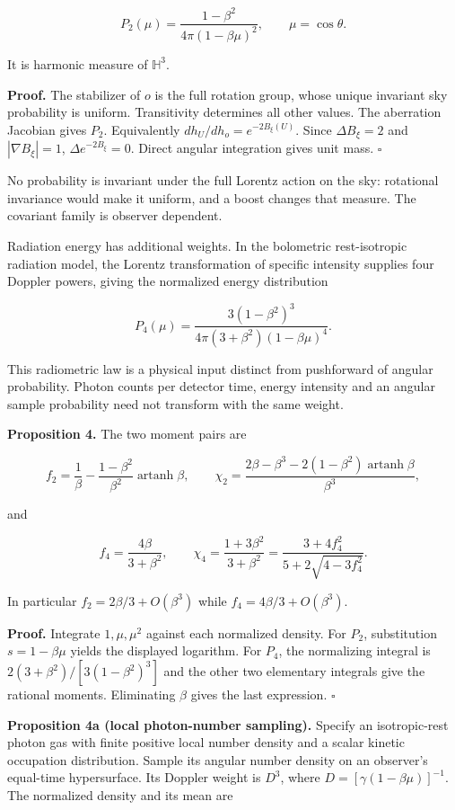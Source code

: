 \documentclass[
  11pt,
  a4paper,
]{article}
\begin{document}
\[P_2(\mu)=\frac{1-\beta^2}{4\pi(1-\beta\mu)^2},\qquad \mu=\cos\theta.\]

It is harmonic measure of \(\mathbb H^3\).

\textbf{Proof.} The stabilizer of \(o\) is the full rotation group, whose unique invariant sky probability is uniform. Transitivity determines all other values. The aberration Jacobian gives \(P_2\). Equivalently \(dh_U/dh_o=e^{-2B_\xi(U)}\). Since \(\Delta B_\xi=2\) and \(|\nabla B_\xi|=1\), \(\Delta e^{-2B_\xi}=0\). Direct angular integration gives unit mass. \(\square\)

No probability is invariant under the full Lorentz action on the sky: rotational invariance would make it uniform, and a boost changes that measure. The covariant family is observer dependent.

Radiation energy has additional weights. In the bolometric rest-isotropic radiation model, the Lorentz transformation of specific intensity supplies four Doppler powers, giving the normalized energy distribution

\[P_4(\mu)=
\frac{3(1-\beta^2)^3}
{4\pi(3+\beta^2)(1-\beta\mu)^4}.\]

This radiometric law is a physical input distinct from pushforward of angular probability. Photon counts per detector time, energy intensity and an angular sample probability need not transform with the same weight.

\textbf{Proposition 4.} The two moment pairs are

\[f_2=\frac1\beta-\frac{1-\beta^2}{\beta^2}\operatorname{artanh}\beta,\qquad
\chi_2=\frac{2\beta-\beta^3-2(1-\beta^2)\operatorname{artanh}\beta}{\beta^3},\]

and

\[f_4=\frac{4\beta}{3+\beta^2},\qquad
\chi_4=\frac{1+3\beta^2}{3+\beta^2}
=\frac{3+4f_4^2}{5+2\sqrt{4-3f_4^2}}.\]

In particular \(f_2=2\beta/3+O(\beta^3)\) while \(f_4=4\beta/3+O(\beta^3)\).

\textbf{Proof.} Integrate \(1,\mu,\mu^2\) against each normalized density. For \(P_2\), substitution \(s=1-\beta\mu\) yields the displayed logarithm. For \(P_4\), the normalizing integral is \(2(3+\beta^2)/[3(1-\beta^2)^3]\) and the other two elementary integrals give the rational moments. Eliminating \(\beta\) gives the last expression. \(\square\)

\textbf{Proposition 4a (local photon-number sampling).} Specify an isotropic-rest photon gas with finite positive local number density and a scalar kinetic occupation distribution. Sample its angular number density on an observer's equal-time hypersurface. Its Doppler weight is \(D^3\), where \(D=[\gamma(1-\beta\mu)]^{-1}\). The normalized density and its mean are
\end{document}
